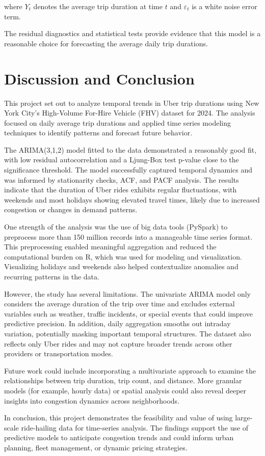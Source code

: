 \documentclass{article}
\begin{document}
where \( Y_t \) denotes the average trip duration at time \( t \) and \( \varepsilon_t \) is a white noise error term.

The residual diagnostics and statistical tests provide evidence that this model is a reasonable choice for forecasting the average daily trip durations.

\section{Discussion and Conclusion}

This project set out to analyze temporal trends in Uber trip durations using New York City's High-Volume For-Hire Vehicle (FHV) dataset for 2024. The analysis focused on daily average trip durations and applied time series modeling techniques to identify patterns and forecast future behavior.

The ARIMA(3,1,2) model fitted to the data demonstrated a reasonably good fit, with low residual autocorrelation and a Ljung-Box test p-value close to the significance threshold. The model successfully captured temporal dynamics and was informed by stationarity checks, ACF, and PACF analysis. The results indicate that the duration of Uber rides exhibits regular fluctuations, with weekends and most holidays showing elevated travel times, likely due to increased congestion or changes in demand patterns.

One strength of the analysis was the use of big data tools (PySpark) to preprocess more than 150 million records into a manageable time series format. This preprocessing enabled meaningful aggregation and reduced the computational burden on R, which was used for modeling and visualization. Visualizing holidays and weekends also helped contextualize anomalies and recurring patterns in the data.

However, the study has several limitations. The univariate ARIMA model only considers the average duration of the trip over time and excludes external variables such as weather, traffic incidents, or special events that could improve predictive precision. In addition, daily aggregation smooths out intraday variation, potentially masking important temporal structures. The dataset also reflects only Uber rides and may not capture broader trends across other providers or transportation modes.

Future work could include incorporating a multivariate approach to examine the relationships between trip duration, trip count, and distance. More granular models (for example, hourly data) or spatial analysis could also reveal deeper insights into congestion dynamics across neighborhoods.

In conclusion, this project demonstrates the feasibility and value of using large-scale ride-hailing data for time-series analysis. The findings support the use of predictive models to anticipate congestion trends and could inform urban planning, fleet management, or dynamic pricing strategies.




\end{document}
